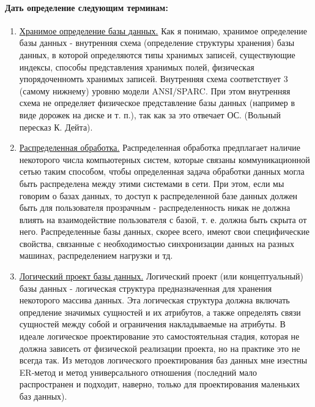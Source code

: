 \documentclass[a4paper,12pt]{article}
\begin{document}
\paragraph{Дать определение следующим терминам:}
\begin{enumerate}
\item \underline{Хранимое определение базы данных.} Как я понимаю, хранимое определение базы данных - внутренняя схема (определение структуры хранения) базы данных, в которой определяются типы хранимых записей, существующие индексы, способы представления хранимых полей, физическая упорядоченномть хранимых записей. Внутренняя схема соответствует 3 (самому нижнему) уровню модели ANSI/SPARC. При этом внутренняя схема не определяет физическое представление базы данных (например в виде дорожек на диске и т. п.), так как за это отвечает ОС. (Вольный пересказ К. Дейта).

\item \underline{Распределенная обработка.} Распределенная обработка предплагает наличие некоторого числа компьютерных систем, которые связаны коммуникационной сетью таким способом, чтобы определенная задача обработки данных могла быть распределена между этими системами в сети. При этом, если мы говорим о базах данных, то доступ к распределенной базе данных должен быть для пользователя прозрачным - распределенность никак не должна влиять на взаимодействие пользователя с базой, т. е. должна быть скрыта от него. Распределенные базы данных, скорее всего, имеют свои специфические свойства, связанные с необходимостью синхронизации данных на разных машинах, распределением нагрузки и тд.

\item \underline{Логический проект базы данных.} Логический проект (или концептуальный) базы данных - логическая структура предназначенная для хранения некоторого массива данных. Эта логическая структура должна включать опредление значимых сущностей и их атрибутов, а также определять связи сущностей между собой и ограничения накладываемые на атрибуты. В идеале логическое проектирование это самостоятельная стадия, которая не должна зависеть от физической реализации проекта, но на практике это не всегда так. Из методов логического проектирования баз данных мне изестны ER-метод и метод универсального отношения (последний мало распространен и подходит, наверно, только для проектирования маленьких баз данных).
\end{enumerate}
\end{document}
